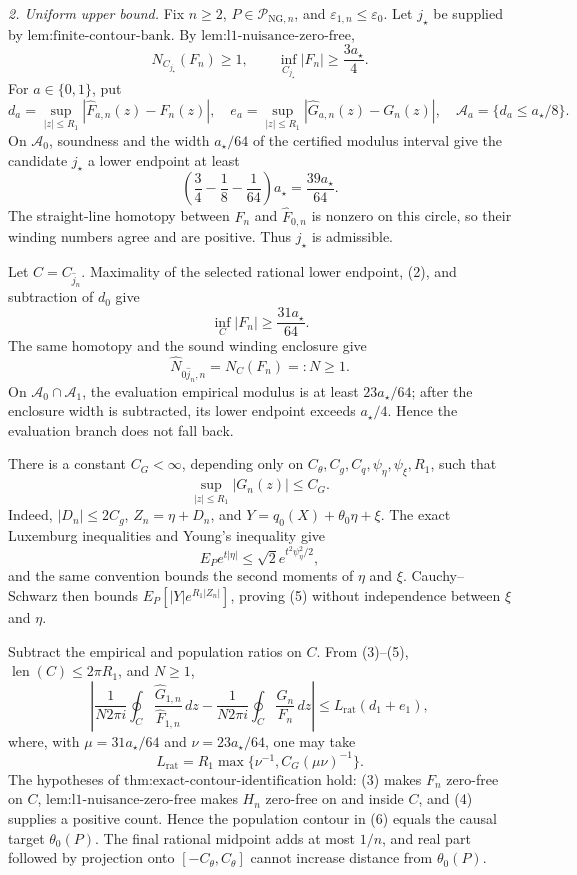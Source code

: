 \emph{2. Uniform upper bound.}  Fix \(n\ge2\), \(P\in\mathcal P_{\mathrm{NG},n}\), and \(\varepsilon_{1,n}\le\varepsilon_0\).  Let \(j_{\star}\) be supplied by \(\text{lem:finite-contour-bank}\).  By \(\text{lem:l1-nuisance-zero-free}\),
\[
 N_{C_{j_{\star}}}(F_n)\ge1,
 \qquad
 \inf_{C_{j_{\star}}}|F_n|\ge\frac{3a_{\star}}4. \tag{1}
\]
For \(a\in\{0,1\}\), put
\[
 d_a=\sup_{|z|\le R_1}|\widehat F_{a,n}(z)-F_n(z)|,
 \quad
 e_a=\sup_{|z|\le R_1}|\widehat G_{a,n}(z)-G_n(z)|,
 \quad
 \mathcal A_a=\{d_a\le a_{\star}/8\}.
\]
On \(\mathcal A_0\), soundness and the width \(a_{\star}/64\) of the certified modulus interval give the candidate \(j_{\star}\) a lower endpoint at least
\[
 \left(\frac34-\frac18-\frac1{64}\right)a_{\star}
 =\frac{39a_{\star}}{64}. \tag{2}
\]
The straight-line homotopy between \(F_n\) and \(\widehat F_{0,n}\) is nonzero on this circle, so their winding numbers agree and are positive.  Thus \(j_{\star}\) is admissible.

Let \(C=C_{\widehat j_n}\).  Maximality of the selected rational lower endpoint, (2), and subtraction of \(d_0\) give
\[
 \inf_C|F_n|\ge\frac{31a_{\star}}{64}. \tag{3}
\]
The same homotopy and the sound winding enclosure give
\[
 \widehat N_{0\widehat j_n,n}=N_C(F_n)=:N\ge1. \tag{4}
\]
On \(\mathcal A_0\cap\mathcal A_1\), the evaluation empirical modulus is at least \(23a_{\star}/64\); after the enclosure width is subtracted, its lower endpoint exceeds \(a_{\star}/4\).  Hence the evaluation branch does not fall back.

There is a constant \(C_G<\infty\), depending only on \(C_{\theta},C_g,C_q,\psi_{\eta},\psi_{\xi},R_1\), such that
\[
 \sup_{|z|\le R_1}|G_n(z)|\le C_G. \tag{5}
\]
Indeed, \(|D_n|\le2C_g\), \(Z_n=\eta+D_n\), and \(Y=q_0(X)+\theta_0\eta+\xi\).  The exact Luxemburg inequalities and Young's inequality give
\[
 E_Pe^{t|\eta|}\le\sqrt2e^{t^2\psi_{\eta}^2/2},
\]
and the same convention bounds the second moments of \(\eta\) and \(\xi\).  Cauchy--Schwarz then bounds \(E_P[|Y|e^{R_1|Z_n|}]\), proving (5) without independence between \(\xi\) and \(\eta\).

Subtract the empirical and population ratios on \(C\).  From (3)--(5), \(\operatorname{len}(C)\le2\pi R_1\), and \(N\ge1\),
\[
 \left|
 \frac1{N2\pi i}\oint_C\frac{\widehat G_{1,n}}{\widehat F_{1,n}}\,dz
 -\frac1{N2\pi i}\oint_C\frac{G_n}{F_n}\,dz
 \right|
 \le L_{\mathrm{rat}}(d_1+e_1), \tag{6}
\]
where, with \(\mu=31a_{\star}/64\) and \(\nu=23a_{\star}/64\), one may take
\[
 L_{\mathrm{rat}}=R_1\max\{\nu^{-1},C_G(\mu\nu)^{-1}\}. \tag{7}
\]
The hypotheses of \(\text{thm:exact-contour-identification}\) hold: (3) makes \(F_n\) zero-free on \(C\), \(\text{lem:l1-nuisance-zero-free}\) makes \(H_n\) zero-free on and inside \(C\), and (4) supplies a positive count.  Hence the population contour in (6) equals the causal target \(\theta_0(P)\).  The final rational midpoint adds at most \(1/n\), and real part followed by projection onto \([-C_{\theta},C_{\theta}]\) cannot increase distance from \(\theta_0(P)\).

